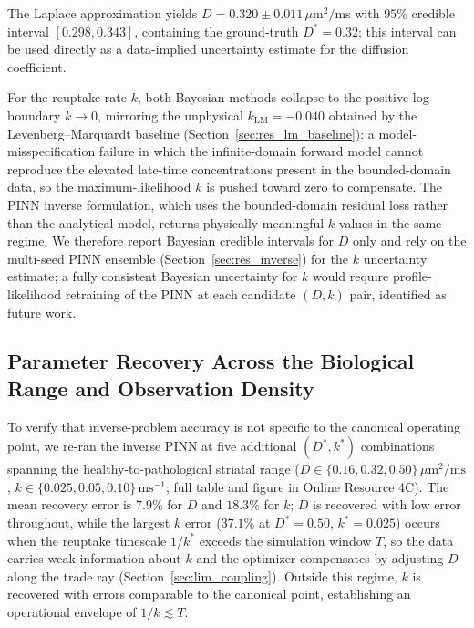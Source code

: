 \documentclass[12pt]{article}
\begin{document}
The Laplace approximation yields
$D = 0.320 \pm 0.011\,\mu\text{m}^2/\text{ms}$ with $95\%$
credible interval $[0.298, 0.343]$, containing the ground-truth
$D^* = 0.32$; this interval can be used directly as a
data-implied uncertainty estimate for the diffusion coefficient.

For the reuptake rate $k$, both Bayesian methods collapse to the
positive-log boundary $k \to 0$, mirroring the unphysical
$k_{\mathrm{LM}} = -0.040$ obtained by the Levenberg--Marquardt
baseline (Section~\ref{sec:res_lm_baseline}): a
model-misspecification failure in which the infinite-domain
forward model cannot reproduce the elevated late-time
concentrations present in the bounded-domain data, so the
maximum-likelihood $k$ is pushed toward zero to compensate. The
PINN inverse formulation, which uses the bounded-domain residual
loss rather than the analytical model, returns physically
meaningful $k$ values in the same regime. We therefore report
Bayesian credible intervals for $D$ only and rely on the
multi-seed PINN ensemble (Section~\ref{sec:res_inverse}) for the
$k$ uncertainty estimate; a fully consistent Bayesian uncertainty
for $k$ would require profile-likelihood retraining of the PINN
at each candidate $(D, k)$ pair, identified as future work.

\subsection{Parameter Recovery Across the Biological Range and
Observation Density}
\label{sec:res_param_grid}

To verify that inverse-problem accuracy is not specific to the
canonical operating point, we re-ran the inverse PINN at five
additional $(D^*, k^*)$ combinations spanning the
healthy-to-pathological striatal range
\cite{CraggRice2004, Nicholson1981, Wiencke2020}
($D \in \{0.16, 0.32, 0.50\}\,\mu\text{m}^2/\text{ms}$,
$k \in \{0.025, 0.05, 0.10\}\,\text{ms}^{-1}$; full table and
figure in Online Resource 4C). The mean recovery error is
$7.9\%$ for $D$ and $18.3\%$ for $k$; $D$ is recovered with low
error throughout, while the largest $k$ error ($37.1\%$ at
$D^*=0.50$, $k^*=0.025$) occurs when the reuptake timescale
$1/k^*$ exceeds the simulation window $T$, so the data carries
weak information about $k$ and the optimizer compensates by
adjusting $D$ along the trade ray (Section~\ref{sec:lim_coupling}).
Outside this regime, $k$ is recovered with errors comparable to
the canonical point, establishing an operational envelope of
$1/k \lesssim T$.
\end{document}
